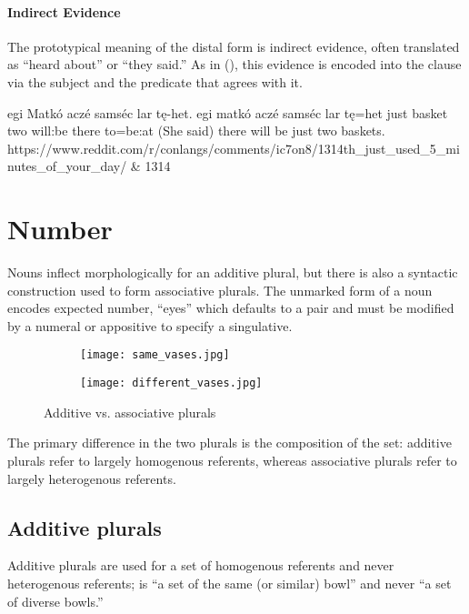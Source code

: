 \paragraph{Indirect Evidence}
The prototypical meaning of the distal form is indirect evidence, often translated as “heard about” or “they said.” As in (\nextx), this evidence is encoded into the clause via the subject and the predicate that agrees with it.

\begin{example*}
    \script egi Matkó aczé samséc lar tę-het.
    \bits egi matkó aczé samséc lar tę=het
    \gloss just basket\tbs{} two\tbs{} will:be\tbs{} there to=be:at
    \tr (She said) there will be just two baskets.
    \smoyd https://www.reddit.com/r/conlangs/comments/ic7on8/1314th_just_used_5_minutes_of_your_day/ & 1314
\end{example*}

\section{Number}
Nouns inflect morphologically for an additive plural, but there is also a syntactic construction used to form associative plurals. The unmarked form of a noun encodes expected number, \eg {} “eyes” which defaults to a pair and must be modified by a numeral or appositive to specify a singulative. 

\begin{figure}[h]
    \centering
    \begin{subfigure}{0.4\textwidth}
        \centering
        \texttt{[image: same\_vases.jpg]}
        \caption{}
    \end{subfigure}
    \begin{subfigure}{0.4\textwidth}
        \centering
        \texttt{[image: different\_vases.jpg]}
        \caption{}
    \end{subfigure}
    \caption{Additive vs. associative plurals}
\end{figure}

The primary difference in the two plurals is the composition of the set: additive plurals refer to largely homogenous referents, whereas associative plurals refer to largely heterogenous referents.

\subsection{Additive plurals} \label{subsec:additive_plural}
Additive plurals are used for a set of homogenous referents and never heterogenous referents; \eg {} is “a set of the same (or similar) bowl” and never “a set of diverse bowls.”

